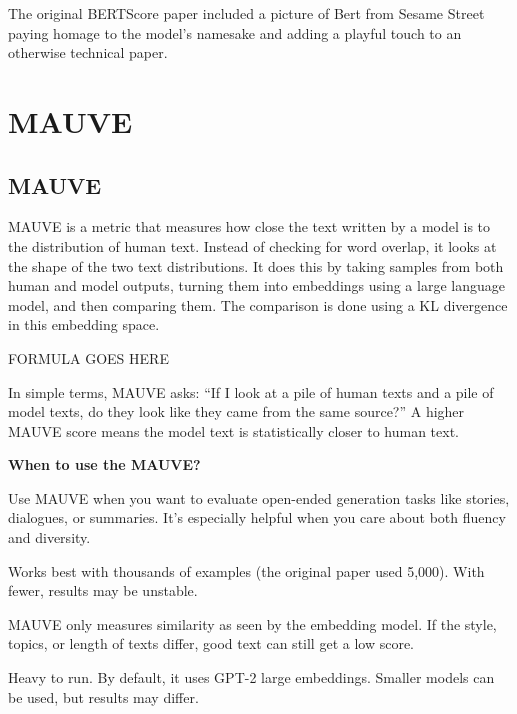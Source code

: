 \clearpage

\thispagestyle{customstyle}

{The original BERTScore paper included a picture of Bert from Sesame Street paying homage to the model’s namesake and adding a playful touch to an
otherwise technical paper.}

\clearpage
\thispagestyle{genaistyle}
\section{MAUVE}
\subsection{MAUVE}


MAUVE is a metric that measures how close the text written by a model is to the distribution of human text. Instead of checking for word overlap,
it looks at the shape of the two text distributions. It does this by taking samples from both human and model outputs, turning them into embeddings
using a large language model, and then comparing them. The comparison is done using a KL divergence in this embedding space. 

\begin{center}
    FORMULA GOES HERE
\end{center}

In simple terms, MAUVE asks: “If I look at a pile of human texts and a pile of model texts, do they look like they came from the same source?”
A higher MAUVE score means the model text is statistically closer to human text.

\textbf{When to use the MAUVE?}

Use MAUVE when you want to evaluate open-ended generation tasks like stories, dialogues, or summaries. It’s especially helpful when you care
about both fluency and diversity.

{
\item Works best with thousands of examples (the original paper used 5,000). With fewer, results may be unstable.
\item MAUVE only measures similarity as seen by the embedding model. If the style, topics, or length of texts differ, good text can still get
a low score.
\item Heavy to run. By default, it uses GPT-2 large embeddings. Smaller models can be used, but results may differ.
}

